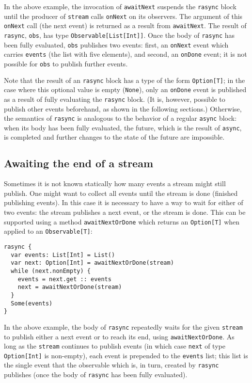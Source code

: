\documentclass{acm_proc_article-sp}
\begin{document}
In the above example, the invocation of \verb|awaitNext| suspends the
\verb|rasync| block until the producer of \verb|stream| calls \verb|onNext| on
its observers. The argument of this \verb|onNext| call (the next event) is
returned as a result from \verb|awaitNext|. The result of \verb|rasync|,
\verb|obs|, has type \verb|Observable[List[Int]]|. Once the body of
\verb|rasync| has been fully evaluated, \verb|obs| publishes two events:
first, an \verb|onNext| event which carries \verb|events| (the list with five
elements), and second, an \verb|onDone| event; it is not possible for
\verb|obs| to publish further events.

Note that the result of an \verb|rasync| block has a type of the form
\verb|Option[T]|; in the case where this optional value is empty
(\verb|None|), only an \verb|onDone| event is published as a result of fully
evaluating the \verb|rasync| block. (It is, however, possible to publish other
events beforehand, as shown in the following sections.) Otherwise, the
semantics of \verb|rasync| is analogous to the behavior of a regular
\verb|async| block: when its body has been fully evaluated, the future, which
is the result of \verb|async|, is completed and further changes to the state
of the future are impossible.


\subsection{Awaiting the end of a stream}

Sometimes it is not known statically how many events a stream might still
publish. One might want to collect all events until the stream is done
(finished publishing events). In this case it is necessary to have a way to
wait for either of two events: the stream publishes a next event, or the
stream is done. This can be supported using a method \verb|awaitNextOrDone|
which returns an \verb|Option[T]| when applied to an \verb|Observable[T]|:

\begin{lstlisting}
rasync {
  var events: List[Int] = List()
  var next: Option[Int] = awaitNextOrDone(stream)
  while (next.nonEmpty) {
    events = next.get :: events
    next = awaitNextOrDone(stream)
  }
  Some(events)
}
\end{lstlisting}

In the above example, the body of \verb|rasync| repeatedly waits for the given
\verb|stream| to publish either a next event or to reach its end, using
\verb|awaitNextOrDone|. As long as the \verb|stream| continues to publish
events (in which case \verb|next| of type \verb|Option[Int]| is non-empty),
each event is prepended to the \verb|events| list; this list is the single
event that the observable which is, in turn, created by \verb|rasync|
publishes (once the body of \verb|rasync| has been fully evaluated).
\end{document}
